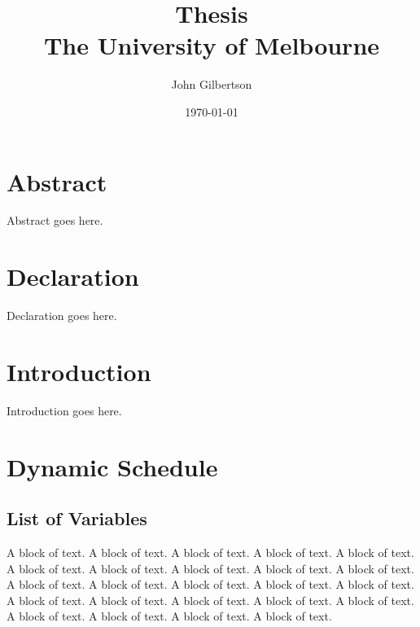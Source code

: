 \documentclass[12pt]{report}
\title{
	{Thesis} \\
	{\large The University of Melbourne}
}
\author{John Gilbertson}
\date{\today}
\begin{document}
\maketitle

\chapter*{Abstract}

Abstract goes here.

\chapter*{Declaration}

Declaration goes here.

\tableofcontents

\newpage

\chapter{Introduction}

Introduction goes here.

\chapter{Dynamic Schedule}

\section{List of Variables}

A block of text. A block of text. A block of text. A block of text. A block of text. A block of text. A block of text. A block of text. A block of text. A block of text. A block of text. A block of text. A block of text. A block of text. A block of text. A block of text. A block of text. A block of text. A block of text. A block of text. A block of text. A block of text. A block of text. A block of text.
\end{document}
